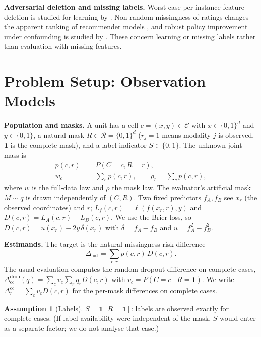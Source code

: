 \documentclass{article}
\theoremstyle{plain}
\theoremstyle{definition}
\newtheorem{assumption}{Assumption}
\theoremstyle{remark}
\newcommand{\one}{\mathbf{1}}
\newcommand{\cC}{\mathcal{C}}
\newcommand{\cR}{\mathcal{R}}
\newcommand{\Dnat}{\Delta_{\mathrm{nat}}}
\begin{document}
\textbf{Adversarial deletion and missing labels.} Worst-case per-instance
feature deletion is studied for learning by \citet{globerson2006nightmare}.
Non-random missingness of ratings changes the apparent ranking of
recommender models \cite{marlin2009collaborative}, and robust policy
improvement under confounding is studied by \citet{kallus2018confounding}.
These concern learning or missing labels rather than evaluation with missing
features.

\section{Problem Setup: Observation Models}
\label{sec:setup}

\textbf{Population and masks.} A unit has a cell $c=(x,y)\in\cC$ with
$x\in\{0,1\}^d$ and $y\in\{0,1\}$, a natural mask $R\in\cR=\{0,1\}^d$ ($r_j=1$
means modality $j$ is observed, $\one$ is the complete mask), and a label
indicator $S\in\{0,1\}$. The unknown joint mass is
\begin{equation*}
\begin{aligned}
p(c,r)&=P(C=c,R=r),\\
w_c&=\textstyle\sum_r p(c,r),\qquad \rho_r=\textstyle\sum_c p(c,r),
\end{aligned}
\end{equation*}
where $w$ is the full-data law and $\rho$ the mask law.
The evaluator's artificial mask $M\sim q$ is drawn independently of $(C,R)$.
Two fixed predictors $f_A,f_B$ see $x_r$ (the observed coordinates) and $r$;
$L_f(c,r)=\ell(f(x_r,r),y)$ and $D(c,r)=L_A(c,r)-L_B(c,r)$. We use the Brier
loss, so $D(c,r)=u(x_r)-2y\,\delta(x_r)$ with $\delta=f_A-f_B$ and
$u=f_A^2-f_B^2$.

\textbf{Estimands.} The target is the natural-missingness risk difference
\[
\Dnat=\textstyle\sum_{c,r}p(c,r)\,D(c,r).
\]
The usual evaluation computes the random-dropout difference on complete
cases, $\Delta^{\mathrm{drop}}_{\mathrm{cc}}(q)=\sum_c v_c\sum_r q_r D(c,r)$
with $v_c=P(C=c\mid R=\one)$. We write
$\Delta^{\mathrm{cc}}_r=\sum_c v_c D(c,r)$ for the per-mask differences on
complete cases.

\begin{assumption}[Labels]\label{ass:labels}
$S=\mathbb{1}[R=\one]$: labels are observed exactly for complete cases. (If
label availability were independent of the mask, $S$ would enter as a
separate factor; we do not analyse that case.)
\end{assumption}
\end{document}
